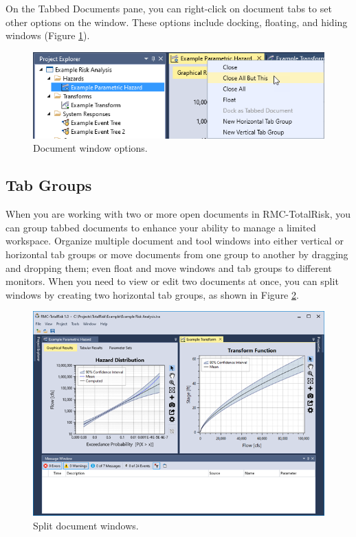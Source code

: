 \documentclass[
]{book}
\begin{document}
On the Tabbed Documents pane, you can right-click on document tabs to set other options on the window. These options include docking, floating, and hiding windows (Figure \ref{fig:figure-19}).

\begin{figure}

{\centering \includegraphics{images/figure19} 

}

\caption{Document window options.}\label{fig:figure-19}
\end{figure}

\hypertarget{tab-groups}{%
\subsection{Tab Groups}\label{tab-groups}}

When you are working with two or more open documents in RMC-TotalRisk, you can group tabbed documents to enhance your ability to manage a limited workspace. Organize multiple document and tool windows into either vertical or horizontal tab groups or move documents from one group to another by dragging and dropping them; even float and move windows and tab groups to different monitors. When you need to view or edit two documents at once, you can split windows by creating two horizontal tab groups, as shown in Figure \ref{fig:figure-20}.

\begin{figure}

{\centering \includegraphics{images/figure20} 

}

\caption{Split document windows.}\label{fig:figure-20}
\end{figure}
\end{document}

